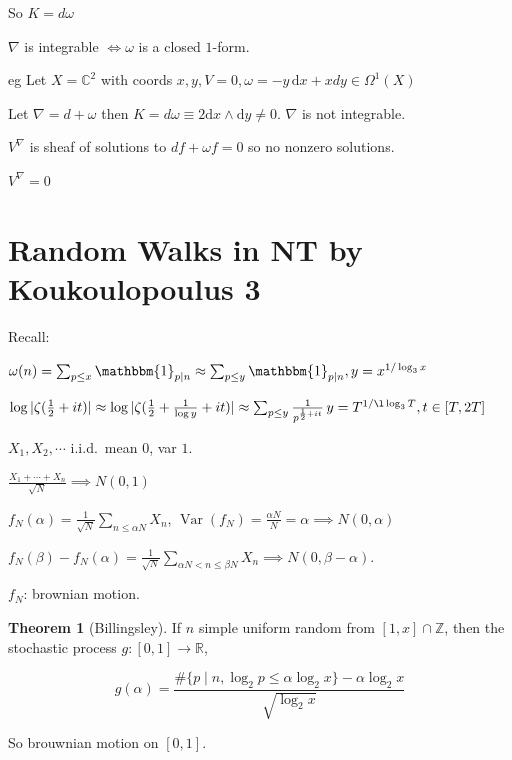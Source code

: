 \documentclass{article}
\theoremstyle{definition}
\newtheorem{theorem}{Theorem}
\begin{document}
    So \(K = d \omega\) 

    \(\nabla\) is integrable \(\iff \omega\) is a closed \(1\)-form.

    eg Let \(X = \mathbb{C}^2\) with coords \(x,y, V = 0, \omega = -y \, \mathrm{d}x  + x dy \in \Omega^1(X)\) 

    Let \(\nabla = d + \omega\) then \(K = d \omega \equiv  2 \mathrm{d} x \wedge \mathrm{d} y \neq 0\). \(\nabla\) is not integrable.

    \(V^\nabla\) is sheaf of solutions to \(df + \omega f = 0 \) so no nonzero solutions.
    
    \(V^\nabla = 0\) 

    \section*{Random Walks in NT by Koukoulopoulus 3}

    Recall:

    \(\omega(n) = \sum_{p \leq x} \mathbbm{1}_{p\mid n} \approx \sum_{p \leq y} \mathbbm{1}_{p\mid n}, y = x^{1 / \log_3 x}\) 

    \(\log \vert \zeta (\frac{1}{2} + it) \vert \approx \log \vert \zeta(\frac{1}{2} + \frac{1}{\log y} + it) \vert \approx \sum_{p \leq y} \frac{1}{p^{\frac{1}{2} + it}} \, y = T^{1 / \l\log _3 T} , t\in [T,2T]\) 

    \(X_1, X_2, \cdots \) i.i.d.\  mean \(0\), var \(1\).

    \(\frac{X_1 + \cdots + X_n}{\sqrt{N}} \implies N(0,1)\)
    
    \(f_N(\alpha) = \frac{1}{\sqrt{N}} \sum_{n \leq \alpha N} X_n\), \(\operatorname{Var} (f_N) = \frac{\alpha N}{N} = \alpha \implies N(0,\alpha)\)
    
    \(f_N(\beta) - f_N(\alpha) = \frac{1}{\sqrt{N}} \sum_{\alpha N < n \leq \beta N} X_n \implies N(0,\beta - \alpha)\).
    
    \(f_N\): brownian motion.

    \begin{theorem}
        [Billingsley] If \(n\) simple uniform random from \([1,x]\cap \mathbb{Z}\), then the stochastic process \(g: [0,1]\to \mathbb{R}\),
        
        \[
            g(\alpha) = \frac{\# \{ p\mid n, \log_2 p \leq  \alpha \log_2 x \} - \alpha \log_2 x }{\sqrt{\log_2 x} } 
        \]

        So brouwnian motion on \([0,1]\).
    \end{theorem}
\end{document}
